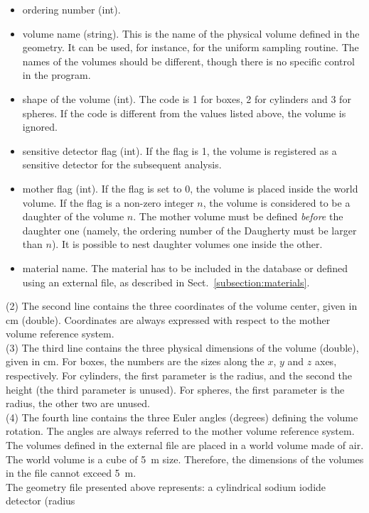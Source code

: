 \begin{itemize}
\item ordering number (int).
\item volume name (string). This is the name of the physical volume defined 
in the geometry. It can be used, for instance, for the uniform sampling 
routine. The names of the volumes should be different, though there is no 
specific control in the program. 
\item shape of the volume (int). The code is 1 for boxes, 2 for cylinders and 
3 for spheres. If the code is different from the values listed above, the volume  
is ignored.
\item sensitive detector flag (int). If the flag is 1, the volume is 
registered as a sensitive detector for the subsequent analysis. 
\item mother flag (int). If the flag is set to 0, the volume is placed inside the 
world volume. If the flag is a non-zero integer $n$, the volume is considered 
to be a daughter of the volume $n$. The mother volume must be defined 
\emph{before} the daughter one (namely, the ordering number of the Daugherty 
must be larger than $n$). It is possible to nest daughter volumes one inside 
the other.
\item material name. The material has to be included in the \mage database 
or defined using an external file, as described in Sect.~\ref{subsection:materials}.
\end{itemize}
(2) The second line contains the three coordinates of the volume center, given in cm (double). 
Coordinates are always expressed with respect to the mother volume reference system. \\
(3) The third line contains the three physical dimensions of the volume (double), given in cm. 
For boxes, the numbers are the sizes along the $x$, $y$ and $z$ axes, respectively. 
For cylinders, the first parameter is the radius, and the second the height (the 
third parameter is unused).  
For spheres, the first parameter is the radius, the other two are unused. \\
(4) The fourth line contains the three Euler angles (degrees) defining the volume rotation. 
The angles are always referred to the mother volume reference system. \\
The volumes defined in the external file are placed in a world volume made of air. The 
world volume is a cube of 5~m size. Therefore, the dimensions of the volumes in 
the file cannot exceed 5~m.\\
The geometry file presented above represents: a cylindrical sodium iodide detector (radius 
